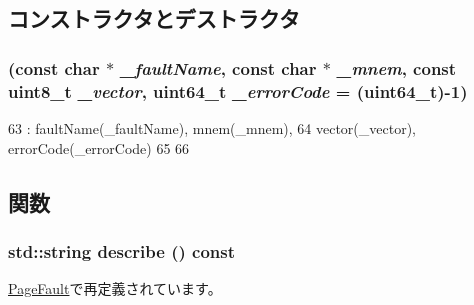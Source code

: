 \subsection{コンストラクタとデストラクタ}
\hypertarget{classX86ISA_1_1X86FaultBase_ac24434dc998ec2bfc13a71d8a5a52c92}{
\subsubsection[{X86FaultBase}]{ (const char $\ast$ {\em \_\-faultName}, \/  const char $\ast$ {\em \_\-mnem}, \/  const uint8\_\-t {\em \_\-vector}, \/  uint64\_\-t {\em \_\-errorCode} = {\ttfamily (uint64\_\-t)-\/1})}}
\label{classX86ISA_1_1X86FaultBase_ac24434dc998ec2bfc13a71d8a5a52c92}



\begin{DoxyCode}
63             : faultName(_faultName), mnem(_mnem),
64               vector(_vector), errorCode(_errorCode)
65         {
66         }
\end{DoxyCode}


\subsection{関数}
\hypertarget{classX86ISA_1_1X86FaultBase_a1d7f1c12bd9a77eda766e6e8dca31e50}{
\subsubsection[{describe}]{\setlength{\rightskip}{0pt plus 5cm}std::string describe () const}}
\label{classX86ISA_1_1X86FaultBase_a1d7f1c12bd9a77eda766e6e8dca31e50}


\hyperlink{classX86ISA_1_1PageFault_a1d7f1c12bd9a77eda766e6e8dca31e50}{PageFault}で再定義されています。


